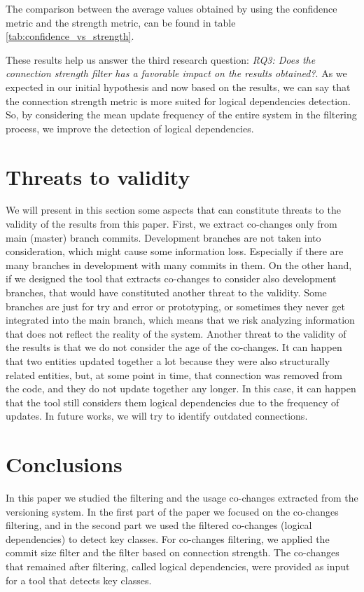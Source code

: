 \documentclass[runningheads]{comsis2}
\begin{document}
The comparison between the average values obtained by using the confidence metric and the strength metric, can be found in table \ref{tab:confidence_vs_strength}.

These results help us answer the third research question: \textit{RQ3: Does the connection strength filter has a favorable impact on the results obtained?}. As we expected in our initial hypothesis and now based on the results, we can say that the connection strength metric is more suited for logical dependencies detection. So, by considering the mean update frequency of the entire system in the filtering process, we improve the detection of logical dependencies.

\section{Threats to validity}
\label{sec:threats}
We will present in this section some aspects that can constitute threats to the validity of the results from this paper. First, we extract co-changes only from main (master) branch commits. Development branches are not taken into consideration, which might cause some information loss. Especially if there are many branches in development with many commits in them. On the other hand, if we designed the tool that extracts co-changes to consider also development branches, that would have constituted another threat to the validity. Some branches are just for try and error or prototyping, or sometimes they never get integrated into the main branch, which means that we risk analyzing information that does not reflect the reality of the system.
Another threat to the validity of the results is that we do not consider the age of the co-changes. It can happen that two entities updated together a lot because they were also structurally related entities, but, at some point in time, that connection was removed from the code, and they do not update together any longer. In this case, it can happen that the tool still considers them logical dependencies due to the frequency of updates. In future works, we will try to identify outdated connections. 

\section{Conclusions}
\label{sec:conclusion}

In this paper we studied the filtering and the usage co-changes extracted from the versioning system. In the first part of the paper we focused on the co-changes filtering, and in the second part we used the filtered co-changes (logical dependencies) to detect key classes.
For co-changes filtering, we applied the commit size filter and the filter based on connection strength. The co-changes that remained after filtering, called logical dependencies, were provided as input for a tool that detects key classes. 
\end{document}
